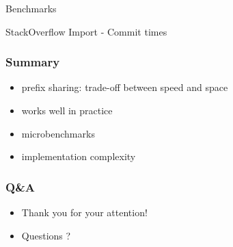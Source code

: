 \documentclass{beamer}
\begin{document}
\begin{section}{Benchmarks}
    \begin{frame}{StackOverflow Import - Commit times}
      \begin{figure}
      \centering
    \end{figure}
    \end{frame}
  \end{section}

  \begin{frame}
    \frametitle{Summary}
      \begin{itemize}
        \item prefix sharing: trade-off between speed and space
        \item works well in practice
        \item microbenchmarks
        \item implementation complexity
      \end{itemize}
  \end{frame}

  \begin{frame}
    \frametitle{Q\&A}
      \begin{itemize}
        \item Thank you for your attention!
        \item Questions ?
      \end{itemize}
  \end{frame}
\end{document}
